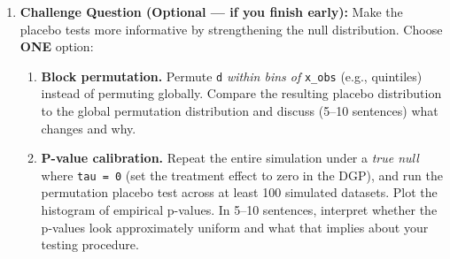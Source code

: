 \documentclass[11pt]{article}
\begin{document}
\begin{enumerate}
\item \textbf{Challenge Question (Optional --- if you finish early):}
Make the placebo tests more informative by strengthening the null distribution.
Choose \textbf{ONE} option:
\begin{enumerate}
  \item \textbf{Block permutation.} Permute \texttt{d} \emph{within bins of} \texttt{x\_obs} (e.g., quintiles) instead of permuting globally. Compare the resulting placebo distribution to the global permutation distribution and discuss (5--10 sentences) what changes and why.
  \item \textbf{P-value calibration.} Repeat the entire simulation under a \emph{true null} where \texttt{tau = 0} (set the treatment effect to zero in the DGP), and run the permutation placebo test across at least 100 simulated datasets. Plot the histogram of empirical p-values. In 5--10 sentences, interpret whether the p-values look approximately uniform and what that implies about your testing procedure.
\end{enumerate}

\end{enumerate}
\end{document}
